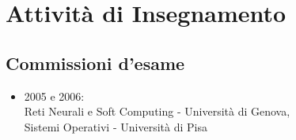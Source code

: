 \documentclass[a4paper,10pt]{article}
\begin{document}
\section*{Attivit\`a di Insegnamento}

\subsection*{Commissioni d'esame}
\begin{itemize}
\item 2005 e 2006: \\
  Reti Neurali e Soft Computing - Universit\`a di Genova, \\ Sistemi Operativi - Universit\`a di Pisa
\end{itemize}
\end{document}
